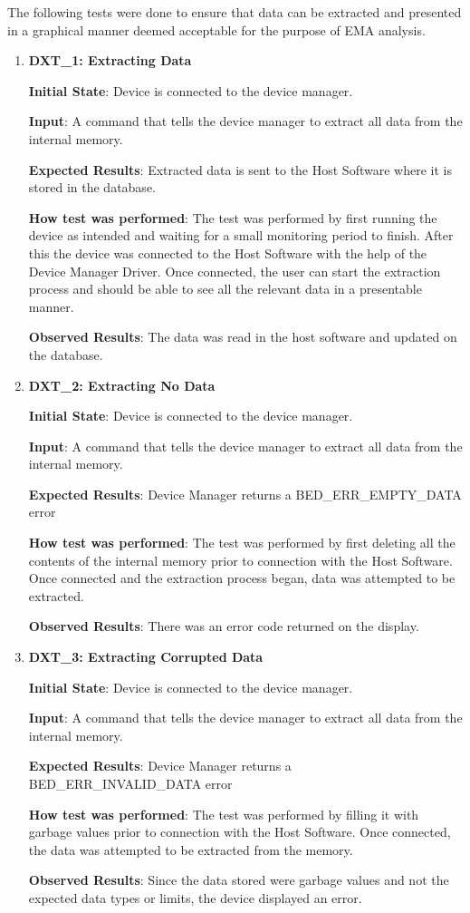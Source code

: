 \documentclass[12pt, titlepage]{article}
\begin{document}
The following tests were done to ensure that data can be extracted and presented in a graphical manner deemed acceptable for the purpose of EMA analysis.
\begin{enumerate}
  \item{\textbf{DXT\_1: Extracting Data} \\}\label{DXT1}

  \textbf{Initial State}: Device is connected to the device manager.

  \textbf{Input}: A command that tells the device manager to extract all data from the internal memory.

  \textbf{Expected Results}: Extracted data is sent to the Host Software where it is stored in the database.

  \textbf{How test was performed}: The test was performed by first running the device as intended and waiting for a small monitoring period to finish. After this the device was connected to the Host Software with the help of the Device Manager Driver. Once connected, the user can start the extraction process and should be able to see all the relevant data in a presentable manner.

  \textbf{Observed Results}: The data was read in the host software and updated on the database.

  \item{\textbf{DXT\_2: Extracting No Data} \\}\label{DXT2}

  \textbf{Initial State}: Device is connected to the device manager.

  \textbf{Input}: A command that tells the device manager to extract all data from the internal memory.

  \textbf{Expected Results}: Device Manager returns a BED\_ERR\_EMPTY\_DATA error

  \textbf{How test was performed}: The test was performed by first deleting all the contents of the internal memory prior to connection with the Host Software. Once connected and the extraction process began, data was attempted to be extracted.

  \textbf{Observed Results}: There was an error code returned on the display.

  \item{\textbf{DXT\_3: Extracting Corrupted Data} \\}\label{DXT3}

  \textbf{Initial State}: Device is connected to the device manager.

  \textbf{Input}: A command that tells the device manager to extract all data from the internal memory.

  \textbf{Expected Results}: Device Manager returns a BED\_ERR\_INVALID\_DATA error

  \textbf{How test was performed}: The test was performed by filling it with garbage values prior to connection with the Host Software. Once connected, the data was attempted to be extracted from the memory.

  \textbf{Observed Results}: Since the data stored were garbage values and not the expected data types or limits, the device displayed an error.
\end{enumerate}
\end{document}
